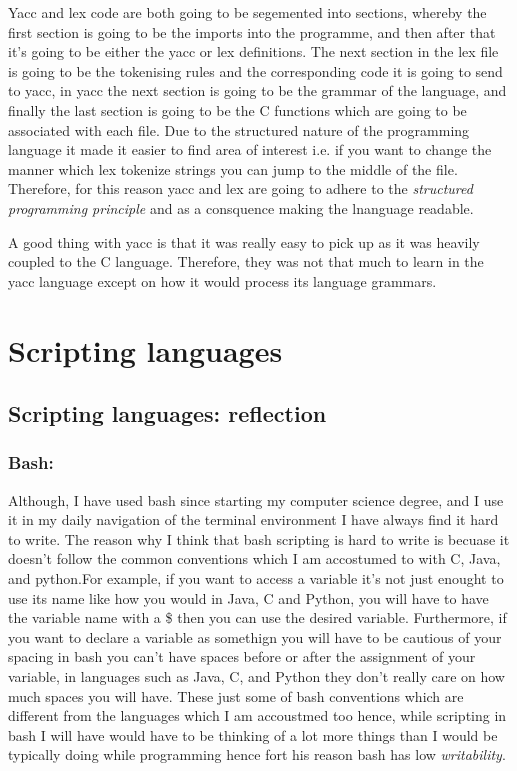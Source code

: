 \documentclass[
	12pt, %
]{fphw}
\begin{document}
Yacc and lex code are both going to be segemented into sections, whereby the
first section is going to be the imports into the programme, and then after that
it's going to be either the yacc or lex definitions. The next section in the lex
file is going to be the tokenising rules and the corresponding code it is going
to send to yacc, in yacc the next section is going to be the grammar of the
language, and finally the last section is going to be the C functions which are
going to be associated with each file. Due to the structured nature of the
programming language it made it easier to find area of interest i.e. if you want
to change the manner which lex tokenize strings you can jump to the middle of the
file. Therefore, for this reason yacc and lex are going to adhere to the
\emph{structured programming principle} and as a consquence making the lnanguage
readable.\par

A good thing with yacc is that it was really easy to pick up as it was heavily
coupled to the C language. Therefore, they was not that much to learn in the
yacc language except on how it would process its language grammars. \par

\section{Scripting languages}


\subsection{Scripting languages: reflection}

\subsubsection{Bash:} Although, I have used bash since starting my computer science
degree, and I use it in my daily navigation of the terminal environment I have
always find it hard to write. The reason why I think that bash scripting is hard
to write is becuase it doesn't follow the common conventions which I am accostumed
to with C, Java, and python.For example, if you want to access a variable it's not
just enought to use its name like how you would in Java, C and Python, you will have
to have the variable name with a \$ then you can use the desired variable. Furthermore,
if you want to declare a variable as somethign you will have to be cautious of your
spacing in bash you can't have spaces before or after the assignment of your variable,
in languages such as Java, C, and Python they don't really care on how much spaces you
will have. These just some of bash conventions which are different from the
languages which I am accoustmed too hence, while scripting in bash I will have
would have to be thinking of a lot more things than I would be typically doing
while programming hence fort his reason bash has low \emph{writability}. \par
\end{document}
